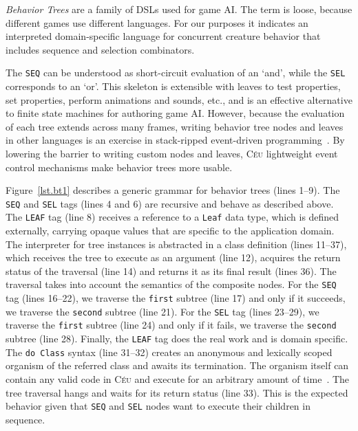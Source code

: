 \documentclass{sig-alternate}
\newcommand{\CEU}{\textsc{C\'{e}u}\xspace}
\newcommand{\code}[1] {{\small{\texttt{#1}}}}
\begin{document}
\emph{Behavior Trees} are a family of DSLs used for game AI.
The term is loose, because different games use different languages.
For our purposes it indicates an interpreted domain-specific language
for concurrent creature behavior that includes sequence and selection combinators.

The \code{SEQ} can be understood as short-circuit evaluation of an `and',
while the \code{SEL} corresponds to an `or'.
This skeleton is extensible with leaves to test properties, set properties, 
perform animations and sounds, etc., and is an effective alternative to finite 
state machines for authoring game AI.
%
However, because the evaluation of each tree extends across many frames, 
writing behavior tree nodes and leaves in other languages is an exercise in 
stack-ripped event-driven programming~\cite{krohn2007events}.
%
%
By lowering the barrier to writing custom nodes and leaves, \CEU lightweight 
event control mechanisms make behavior trees more usable.

Figure~\ref{lst.bt1} describes a generic grammar for behavior trees (lines 
1--9).
The \code{SEQ} and \code{SEL} tags (lines 4 and 6) are recursive and behave as 
described above.
The \code{LEAF} tag (line 8) receives a reference to a \code{Leaf} data type, 
which is defined externally, carrying opaque values that are specific to the 
application domain.
%
The interpreter for tree instances is abstracted in a class definition (lines 
11--37), which receives the tree to execute as an argument (line 12), acquires 
the return status of the traversal (line 14) and returns it as its final result 
(lines 36).
%
The traversal takes into account the semantics of the composite nodes.
%
For the \code{SEQ} tag (lines 16--22), we traverse the \code{first} subtree 
(line 17) and only if it succeeds, we traverse the \code{second} subtree (line 
21).
%
For the \code{SEL} tag (lines 23--29), we traverse the \code{first} subtree 
(line 24) and only if it fails, we traverse the \code{second} subtree (line 
28).
%
Finally, the \code{LEAF} tag does the real work and is domain specific.
The \code{do Class} syntax (line 31--32) creates an anonymous and lexically 
scoped organism of the referred class and awaits its termination.
The organism itself can contain any valid code in \CEU and execute for an 
arbitrary amount of time~\cite{ceu.mod15}.
The tree traversal hangs and waits for its return status (line 33).
This is the expected behavior given that \code{SEQ} and \code{SEL} nodes want 
to execute their children in sequence.
\end{document}
